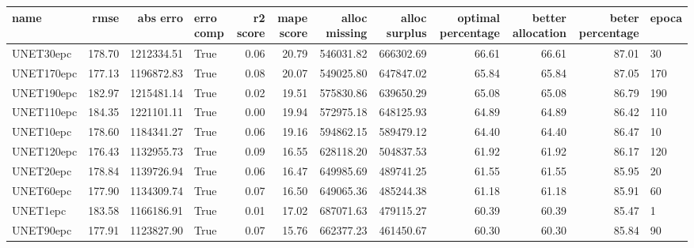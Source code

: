 \begin{tabular}{lrrlrrrrrrrl}
\toprule
name & rmse & abs erro & erro comp & r2 score & mape score & alloc missing & alloc surplus & optimal percentage & better allocation & beter percentage & epoca \\
\midrule
UNET30epc & 178.70 & 1212334.51 & True & 0.06 & 20.79 & 546031.82 & 666302.69 & 66.61 & 66.61 & 87.01 & 30 \\
UNET170epc & 177.13 & 1196872.83 & True & 0.08 & 20.07 & 549025.80 & 647847.02 & 65.84 & 65.84 & 87.05 & 170 \\
UNET190epc & 182.97 & 1215481.14 & True & 0.02 & 19.51 & 575830.86 & 639650.29 & 65.08 & 65.08 & 86.79 & 190 \\
UNET110epc & 184.35 & 1221101.11 & True & 0.00 & 19.94 & 572975.18 & 648125.93 & 64.89 & 64.89 & 86.42 & 110 \\
UNET10epc & 178.60 & 1184341.27 & True & 0.06 & 19.16 & 594862.15 & 589479.12 & 64.40 & 64.40 & 86.47 & 10 \\
UNET120epc & 176.43 & 1132955.73 & True & 0.09 & 16.55 & 628118.20 & 504837.53 & 61.92 & 61.92 & 86.17 & 120 \\
UNET20epc & 178.84 & 1139726.94 & True & 0.06 & 16.47 & 649985.69 & 489741.25 & 61.55 & 61.55 & 85.95 & 20 \\
UNET60epc & 177.90 & 1134309.74 & True & 0.07 & 16.50 & 649065.36 & 485244.38 & 61.18 & 61.18 & 85.91 & 60 \\
UNET1epc & 183.58 & 1166186.91 & True & 0.01 & 17.02 & 687071.63 & 479115.27 & 60.39 & 60.39 & 85.47 & 1 \\
UNET90epc & 177.91 & 1123827.90 & True & 0.07 & 15.76 & 662377.23 & 461450.67 & 60.30 & 60.30 & 85.84 & 90 \\
\bottomrule
\end{tabular}
